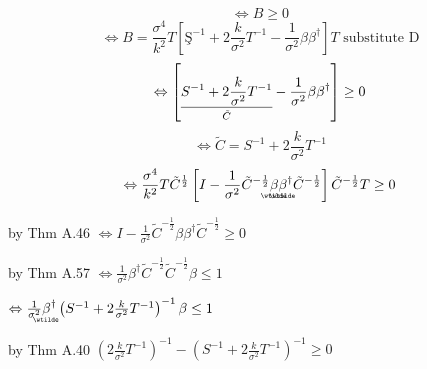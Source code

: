 \documentclass{article}
\begin{document}
\begin{enumerate}
\begin{equation*}
\end{equation*}%
\begin{equation*}
\Leftrightarrow B\geq 0
\end{equation*}%
\begin{equation*}
\Leftrightarrow B=\frac{\sigma ^{4}}{k^{2}}T\left[ \text{\c{S}}^{-1}+2\frac{k%
}{\sigma ^{2}}T^{-1}-\frac{1}{\sigma ^{2}}\beta \beta ^{\dagger }\right] T%
\text{ \ \ \ substitute D}
\end{equation*}%
\begin{equation*}
\Leftrightarrow \left[ \underset{\tilde{C}}{\underline{S^{-1}+2\frac{k}{%
\sigma ^{2}}T^{-1}}}-\frac{1}{\sigma ^{2}}\beta \beta ^{\dagger }\right]
\geq 0
\end{equation*}%
\begin{equation*}
\Leftrightarrow \tilde{C}=S^{-1}+2\frac{k}{\sigma ^{2}}T^{-1}
\end{equation*}%
\begin{equation*}
\Leftrightarrow \frac{\sigma ^{4}}{k^{2}}T\tilde{C}^{\frac{1}{2}}\left[ I-%
\frac{1}{\sigma ^{2}}\tilde{C}^{-\frac{1}{2}}%
\underaccent{\wtilde}{\beta}%
\underaccent{\wtilde}{\beta}%
^{\dagger }\tilde{C}^{-\frac{1}{2}}\right] \tilde{C}^{-\frac{1}{2}}T\geq 0
\end{equation*}
\end{enumerate}

by Thm A.46 $\Leftrightarrow I-\frac{1}{\sigma ^{2}}\tilde{C}^{-\frac{1}{2}%
}\beta \beta ^{\dagger }\tilde{C}^{-\frac{1}{2}}\geq 0$

by Thm A.57 $\Leftrightarrow \frac{1}{\sigma ^{2}}\beta ^{\dagger }\tilde{C}%
^{-\frac{1}{2}}\tilde{C}^{-\frac{1}{2}}\beta \leq 1$

$\Leftrightarrow \frac{1}{\sigma ^{2}}%
\underaccent{\wtilde}{\beta}%
^{\dagger }\left( S^{-1}+2\frac{k}{\sigma ^{2}}T^{-1}\right) ^{-1}\beta \leq
1$

by Thm A.40 $\left( 2\frac{k}{\sigma ^{2}}T^{-1}\right) ^{-1}-\left( S^{-1}+2%
\frac{k}{\sigma ^{2}}T^{-1}\right) ^{-1}\geq 0$
\end{document}
